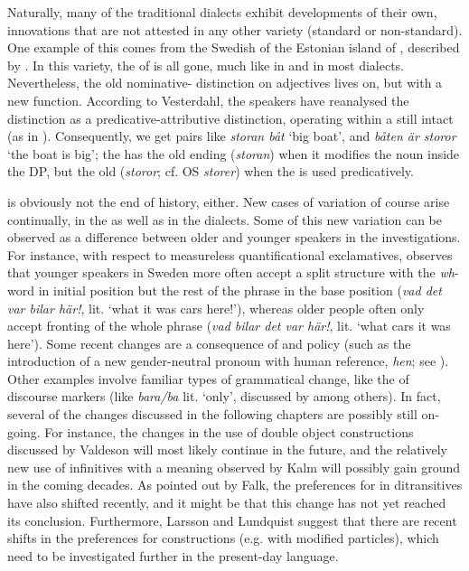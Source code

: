 \documentclass[output=paper]{langscibook}
\begin{document}
Naturally, many of the traditional dialects exhibit developments of their own, innovations that are not attested in any other variety (standard or non-standard). One example of this comes from the Swedish  of the Estonian island of , described by \citet{Vesterdahl2018}. In this variety, the  of  is all gone, much like in  and in most dialects. Nevertheless, the old nominative- distinction on adjectives lives on, but with a new function. According to Vesterdahl, the  speakers have reanalysed the distinction as a predicative-attributive distinction, operating within a still intact  (as in ). Consequently, we get pairs like \textit{storan båt} ‘big boat’, and \textit{båten är storor} ‘the boat is big’; the  has the old   ending (\textit{storan}) when it modifies the noun inside the DP, but the old   (\textit{storor}; cf. OS \textit{storer}) when the  is used predicatively.



 is obviously not the end of history, either. New cases of variation of course arise continually, in the  as well as in the dialects. Some of this new variation can be observed as a difference between older and younger speakers in the  investigations. For instance, with respect to measureless quantificational exclamatives, \citet{Vangsnes2014} observes that younger speakers in Sweden more often accept a split structure with the \textit{wh}{}-word in initial position but the rest of the phrase in the base position (\textit{vad det var bilar här!}, lit. ‘what it was cars here!’), whereas older people often only accept fronting of the whole phrase (\textit{vad bilar det var här!}, lit. ‘what cars it was here’). Some recent changes are a consequence of  and policy (such as the introduction of a new gender-neutral pronoun with human reference, \textit{hen}; see \citealt{LedinLyngfelt2013}). Other examples involve familiar types of grammatical change, like the  of discourse markers (like \textit{bara/ba} lit. ‘only’, discussed by \citealt{Eriksson1995} among others). In fact, several of the changes discussed in the following chapters are possibly still on-going. For instance, the changes in the use of double object constructions discussed by Valdeson will most likely continue in the future, and the relatively new use of  infinitives with a  meaning observed by Kalm will possibly gain ground in the coming decades. As pointed out by Falk, the preferences for  in ditransitives have also shifted recently, and it might be that this change has not yet reached its conclusion. Furthermore, Larsson and Lundquist suggest that there are recent shifts in the preferences for  constructions (e.g. with modified particles), which need to be investigated further in the present-day language.
\end{document}
